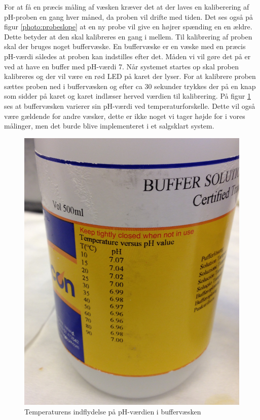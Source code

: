 For at få en præcis måling af væsken kræver det at der laves en kaliberering af pH-proben en gang hver måned, da proben vil drifte med tiden. Det ses også på figur \ref{photo:probeslope} at en ny probe vil give en højrer spænding en en ældre. Dette betyder at den skal kalibreres en gang i mellem. Til kalibrering af proben skal der bruges noget buffervæske. En buffervæske er en væske med en præcis pH-værdi således at proben kan indstilles efter det. Måden vi vil gøre det på er ved at have en buffer med pH-værdi 7. Når systemet startes op skal proben kalibreres og der vil være en rød LED på karet der lyser. For at kalibrere proben sættes proben ned i buffervæsken og efter ca 30 sekunder trykkes der på en knap som sidder på karet og karet indlæser herved værdien til kalibrering. På figur \ref{photo:buffer_vaeske} ses at buffervæsken varierer sin pH-værdi ved temperaturforskelle. Dette vil også være gældende for andre væsker, dette er ikke noget vi tager højde for i vores målinger, men det burde blive implementeret i et salgsklart system. 

 \begin{figure}[H]
	\centering 
	\includegraphics[scale=0.1]{HardwareArkitektur/Sensore/pH_probe_billeder/buffervaeske.jpg}
	\caption{Temperaturens indflydelse på pH-værdien i buffervæsken}
	\label{photo:buffer_vaeske}
\end{figure} 






